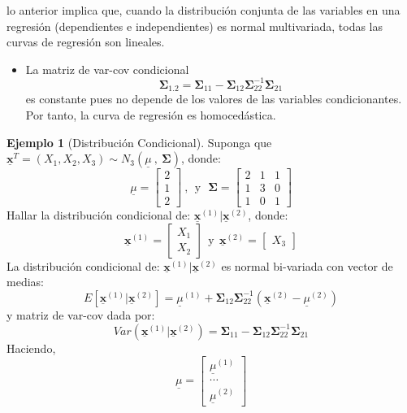 \documentclass[
]{book}
\providecommand{\tightlist}{%
  \setlength{\itemsep}{0pt}\setlength{\parskip}{0pt}}
\theoremstyle{definition}
\theoremstyle{definition}
\newtheorem{example}{Ejemplo}[chapter]
\theoremstyle{definition}
\theoremstyle{definition}
\theoremstyle{remark}
\begin{document}
lo anterior implica que, cuando la distribución conjunta de las variables en una regresión (dependientes e independientes) es normal multivariada, todas las curvas de regresión son lineales.

\begin{itemize}
\tightlist
\item
  La matriz de var-cov condicional
  \[
  \mathbf{\Sigma}_{1.2}=\mathbf{\Sigma}_{11}-\mathbf{\Sigma}_{12}\mathbf{\Sigma}_{22}^{-1}\mathbf{\Sigma}_{21}
  \]
  es constante pues no depende de los valores de las variables condicionantes. Por tanto, la curva de regresión es homocedástica.
\end{itemize}

\begin{example}[Distribución Condicional]
\protect\hypertarget{exm:ejemplo-distrib-condic}{}\label{exm:ejemplo-distrib-condic}Suponga que \(\underline{\mathbf{x}}^{T}=(X_1,X_2,X_3) \sim N_3(\underline{\mu} \ , \ \mathbf{\Sigma} )\), donde:
\[
\underline{\mu}=\begin{bmatrix}
2 \\ 1\\ 2
\end{bmatrix} \ ,\ \ \text{y} \ \ \ \mathbf{\Sigma}=\begin{bmatrix}
2 & 1 &1 \\
1 & 3 & 0 \\
1 & 0 & 1
\end{bmatrix}
\]
Hallar la distribución condicional de: \(\underline{\mathbf{x}}^{(1)} | \underline{\mathbf{x}}^{(2)}\), donde:
\[
\underline{\mathbf{x}}^{(1)}=\begin{bmatrix}
X_1 \\ X_2
\end{bmatrix} \ \ \text{y} \ \ \underline{\mathbf{x}}^{(2)}=\begin{bmatrix} X_3
\end{bmatrix}
\]
La distribución condicional de: \(\underline{\mathbf{x}}^{(1)} | \underline{\mathbf{x}}^{(2)}\) es normal bi-variada con vector de medias:
\[
E[\underline{\mathbf{x}}^{(1)} | \underline{\mathbf{x}}^{(2)} ]=
\underline{\mu}^{(1)}+\mathbf{\Sigma}_{12}\mathbf{\Sigma}_{22}^{-1}\left(\underline{\mathbf{x}}^{(2)}-
\underline{\mu}^{(2)}\right) 
\]
y matriz de var-cov dada por:
\[
Var(\underline{\mathbf{x}}^{(1)} | \underline{\mathbf{x}}^{(2)})=
\mathbf{\Sigma}_{11}-\mathbf{\Sigma}_{12}\mathbf{\Sigma}_{22}^{-1}\mathbf{\Sigma}_{21}
\]
Haciendo,
\[
\underline{\mu}=\begin{bmatrix}
\underline{\mu}^{(1)} \\ \cdots \\ \underline{\mu}^{(2)}

\end{bmatrix}\]
\end{example}
\end{document}
